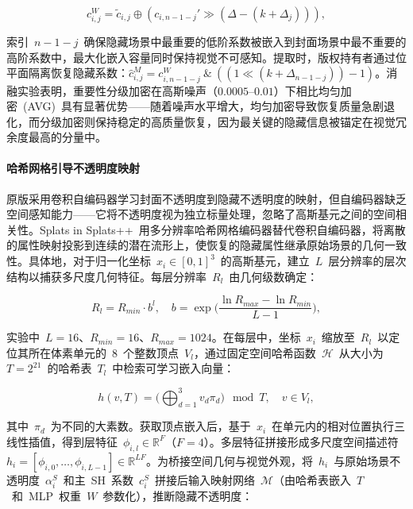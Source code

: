 \begin{equation}
    c_{i,j}^W = \tilde{c}_{i,j} \oplus (c_{i,n-1-j}' \gg (\Delta - (k + \Delta_j))),
\end{equation}

索引~$n-1-j$~确保隐藏场景中最重要的低阶系数被嵌入到封面场景中最不重要的高阶系数中，最大化嵌入容量同时保持视觉不可感知。提取时，版权持有者通过位平面隔离恢复隐藏系数：$\hat{c}_{i,j}^M = c_{i,n-1-j}^W~\&~((1 \ll (k + \Delta_{n-1-j})) - 1)$。消融实验表明，重要性分级加密在高斯噪声（$0.0005$--$0.01$）下相比均匀加密~(AVG)~具有显著优势——随着噪声水平增大，均匀加密导致恢复质量急剧退化，而分级加密则保持稳定的高质量恢复，因为最关键的隐藏信息被锚定在视觉冗余度最高的分量中。

\paragraph{哈希网格引导不透明度映射}原版采用卷积自编码器学习封面不透明度到隐藏不透明度的映射，但自编码器缺乏空间感知能力——它将不透明度视为独立标量处理，忽略了高斯基元之间的空间相关性。Splats in Splats++~用多分辨率哈希网格编码器替代卷积自编码器，将离散的属性映射投影到连续的潜在流形上，使恢复的隐藏属性继承原始场景的几何一致性。具体地，对于归一化坐标~$x_i \in [0, 1]^3$~的高斯基元，建立~$L$~层分辨率的层次结构以捕获多尺度几何特征。每层分辨率~$R_l$~由几何级数确定：

\begin{equation}
    R_l = R_{min} \cdot b^l, \quad b = \exp\!\Big(\frac{\ln R_{max} - \ln R_{min}}{L-1}\Big),
\end{equation}

实验中~$L=16$、$R_{min}=16$、$R_{max}=1024$。在每层中，坐标~$x_i$~缩放至~$R_l$~以定位其所在体素单元的~8~个整数顶点~$V_l$，通过固定空间哈希函数~$\mathcal{H}$~从大小为~$T = 2^{21}$~的哈希表~$T_l$~中检索可学习嵌入向量：

\begin{equation}
    h(v, T) = \Big(\bigoplus_{d=1}^{3} v_d \pi_d\Big) \mod T, \quad v \in V_l,
\end{equation}

其中~$\pi_d$~为不同的大素数。获取顶点嵌入后，基于~$x_i$~在单元内的相对位置执行三线性插值，得到层特征~$\phi_{i,l} \in \mathbb{R}^F$（$F=4$）。多层特征拼接形成多尺度空间描述符~$h_i = [\phi_{i,0}, \ldots, \phi_{i,L-1}] \in \mathbb{R}^{LF}$。为桥接空间几何与视觉外观，将~$h_i$~与原始场景不透明度~$\alpha_i^S$~和主~SH~系数~$c_i^S$~拼接后输入映射网络~$\mathcal{M}$（由哈希表嵌入~$T$~和~MLP~权重~$W$~参数化），推断隐藏不透明度：

